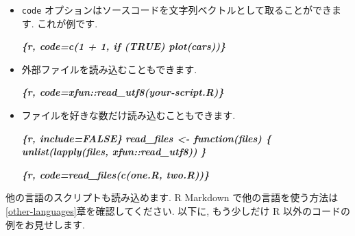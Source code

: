 \documentclass[
  11pt,
  lualatex,
  ja=standard]{bxjsreport}
\newenvironment{Shaded}{\begin{snugshade}}{\end{snugshade}}
\newcommand{\InformationTok}[1]{\textcolor[rgb]{0.56,0.35,0.01}{\textbf{\textit{#1}}}}
\begin{document}
\begin{itemize}
\item
  \texttt{code} オプションはソースコードを文字列ベクトルとして取ることができます. これが例です.

\begin{Shaded}
\begin{Highlighting}[]
\InformationTok{\textasciigrave{}\textasciigrave{}\textasciigrave{}\{r, code=c(\textquotesingle{}1 + 1\textquotesingle{}, \textquotesingle{}if (TRUE) plot(cars)\textquotesingle{})\}}
\InformationTok{\textasciigrave{}\textasciigrave{}\textasciigrave{}}
\end{Highlighting}
\end{Shaded}
\item
  外部ファイルを読み込むこともできます.

\begin{Shaded}
\begin{Highlighting}[]
\InformationTok{\textasciigrave{}\textasciigrave{}\textasciigrave{}\{r, code=xfun::read\_utf8(\textquotesingle{}your{-}script.R\textquotesingle{})\}}
\InformationTok{\textasciigrave{}\textasciigrave{}\textasciigrave{}}
\end{Highlighting}
\end{Shaded}
\item
  ファイルを好きな数だけ読み込むこともできます.

\begin{Shaded}
\begin{Highlighting}[]
\InformationTok{\textasciigrave{}\textasciigrave{}\textasciigrave{}\{r, include=FALSE\}}
\InformationTok{read\_files \textless{}{-} function(files) \{}
\InformationTok{  unlist(lapply(files, xfun::read\_utf8))}
\InformationTok{\}}
\InformationTok{\textasciigrave{}\textasciigrave{}\textasciigrave{}}

\InformationTok{\textasciigrave{}\textasciigrave{}\textasciigrave{}\{r, code=read\_files(c(\textquotesingle{}one.R\textquotesingle{}, \textquotesingle{}two.R\textquotesingle{}))\}}
\InformationTok{\textasciigrave{}\textasciigrave{}\textasciigrave{}}
\end{Highlighting}
\end{Shaded}
\end{itemize}

他の言語のスクリプトも読み込めます. R Markdown で他の言語を使う方法は\ref{other-languages}章を確認してください. 以下に, もう少しだけ R 以外のコードの例をお見せします.
\end{document}
